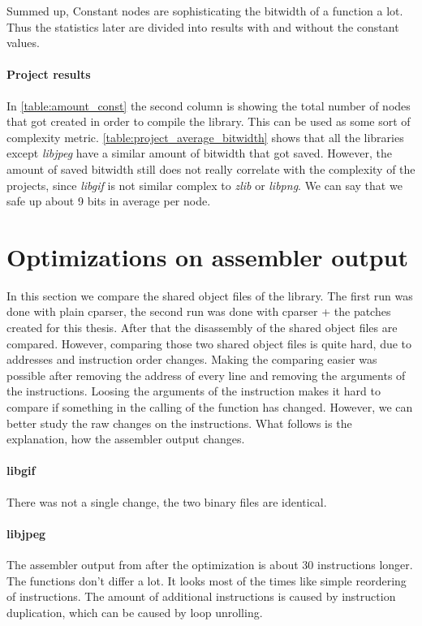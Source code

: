 Summed up, Constant nodes are sophisticating the bitwidth of a function a lot. Thus the statistics later are divided into results with and without the constant values.

\paragraph{Project results}

In \autoref{table:amount_const} the second column is showing the total number of nodes that got created in order to compile the library. This can be used as some sort of complexity metric. 
\autoref{table:project_average_bitwidth} shows that all the libraries except \textit{libjpeg} have a similar amount of bitwidth that got saved. However, the amount of saved bitwidth still does not really correlate with the complexity of the projects, since \textit{libgif} is not similar complex to \textit{zlib} or \textit{libpng}.\newline
We can say that we safe up about 9 bits in average per node.

\section{Optimizations on assembler output}

In this section we compare the shared object files of the library. The first run was done with plain cparser, the second run was done with cparser + the patches created for this thesis.\newline
After that the disassembly of the shared object files are compared. However, comparing those two shared object files is quite hard, due to addresses and instruction order changes. Making the comparing easier was possible after removing the address of every line and removing the arguments of the instructions. Loosing the arguments of the instruction makes it hard to compare if something in the calling of the function has changed. However, we can better study the raw changes on the instructions. What follows is the explanation, how the assembler output changes.

\paragraph{libgif} There was not a single change, the two binary files are identical.
\paragraph{libjpeg} The assembler output from after the optimization is about 30 instructions longer. The functions don't differ a lot. It looks most of the times like simple reordering of instructions. The amount of additional instructions is caused by instruction duplication, which can be caused by loop unrolling.

